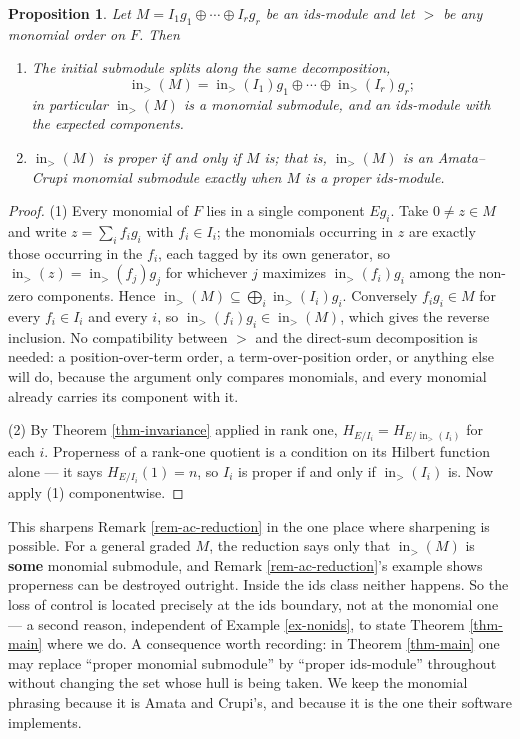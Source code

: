 \documentclass[11pt, a4paper, abstract=yes]{scrartcl}
\theoremstyle{definition}
\theoremstyle{remark}
\theoremstyle{plain}
\newtheorem{proposition}[definition]{Proposition}
\newcommand{\leannone}{\tikz[baseline=-0.6ex]\draw[leannone,line width=0.6pt] (0,0) circle (0.55ex);}
\newcommand{\leanmark}[1]{\leavevmode{\reversemarginpar\marginnote{\raggedleft#1}}}
\newcommand{\inn}{\operatorname{in}}
\begin{document}
\begin{proposition}
\leanmark{\leannone}Let \(M=I_1g_1\oplus\cdots\oplus I_rg_r\) be an ids-module and let \(>\) be \emph{any} monomial order on
\(F\). Then
\begin{enumerate}
\item The initial submodule splits along the same decomposition,
\[
     \inn_>(M)=\inn_>(I_1)g_1\oplus\cdots\oplus\inn_>(I_r)g_r ;
   \]
in particular \(\inn_>(M)\) is a monomial submodule, and an ids-module with the expected
components.
\item \(\inn_>(M)\) is proper if and only if \(M\) is; that is, \(\inn_>(M)\) is an Amata--Crupi
monomial submodule exactly when \(M\) is a proper ids-module.
\end{enumerate}
\label{prop-in-ids}
\end{proposition}

\begin{proof}
(1) Every monomial of \(F\) lies in a single component \(Eg_i\). Take \(0\ne z\in M\) and write
\(z=\sum_i f_ig_i\) with \(f_i\in I_i\); the monomials occurring in \(z\) are exactly those occurring
in the \(f_i\), each tagged by its own generator, so \(\inn_>(z)=\inn_>(f_j)g_j\) for whichever
\(j\) maximizes \(\inn_>(f_i)g_i\) among the non-zero components. Hence
\(\inn_>(M)\subseteq\bigoplus_i\inn_>(I_i)g_i\). Conversely \(f_ig_i\in M\) for every \(f_i\in I_i\)
and every \(i\), so \(\inn_>(f_i)g_i\in\inn_>(M)\), which gives the reverse inclusion. No
compatibility between \(>\) and the direct-sum decomposition is needed: a position-over-term order, a
term-over-position order, or anything else will do, because the argument only compares monomials, and
every monomial already carries its component with it.

(2) By Theorem \ref{thm-invariance} applied in rank one, \(H_{E/I_i}=H_{E/\inn_>(I_i)}\) for each \(i\).
Properness of a rank-one quotient is a condition on its Hilbert function alone --- it says
\(H_{E/I_i}(1)=n\), so \(I_i\) is proper if and only if \(\inn_>(I_i)\) is. Now apply (1)
componentwise.
\end{proof}

This sharpens Remark \ref{rem-ac-reduction} in the one place where sharpening is possible. For a general
graded \(M\), the reduction says only that \(\inn_>(M)\) is \textbf{some} monomial submodule, and
Remark \ref{rem-ac-reduction}'s example shows properness can be destroyed outright. Inside the ids class
neither happens. So the loss of control is located precisely at the ids boundary, not at the monomial
one --- a second reason, independent of Example \ref{ex-nonids}, to state Theorem \ref{thm-main} where we do.
A consequence worth recording: in Theorem \ref{thm-main} one may replace ``proper monomial submodule'' by
``proper ids-module'' throughout without changing the set whose hull is being taken. We keep the
monomial phrasing because it is Amata and Crupi's, and because it is the one their software
implements.
\end{document}
